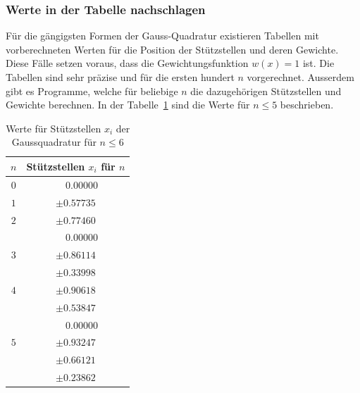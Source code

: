 \subsubsection{Werte in der Tabelle nachschlagen}
Für die gängigsten Formen der Gauss-Quadratur existieren Tabellen mit vorberechneten Werten für die
Position der Stützstellen und deren Gewichte.
Diese Fälle setzen voraus, dass die Gewichtungsfunktion $w(x) = 1$ ist. 
Die Tabellen sind sehr präzise und für die ersten hundert $n$ vorgerechnet.
Ausserdem gibt es Programme, welche für beliebige $n$ die dazugehörigen 
Stützstellen und Gewichte berechnen. 
In der Tabelle~\ref{buch:table:gaussabscissenwerte} sind die Werte für $n \leq 5$ beschrieben.
\begin{table}
    \centering
    \begin{tabular}{|c|c|}
        \hline
        $n$ & Stützstellen $x_{i}$ für $n$ \\
        \hline
        $0$ & $ \phantom{-} 0.00000 $ \\
        \hline
        $1$ & $ \pm 0.57735 $ \\
        \hline
        $2$ & $ \pm 0.77460 $ \\
            & $ \phantom{-} 0.00000 $ \\
        \hline
        $3$ & $ \pm 0.86114 $ \\
            & $ \pm 0.33998 $ \\
        \hline
        $4$ & $ \pm 0.90618 $ \\
            & $ \pm 0.53847 $ \\
            & $ \phantom{-} 0.00000 $ \\
        \hline
        $5$ & $ \pm 0.93247 $ \\
            & $ \pm 0.66121 $ \\
            & $ \pm 0.23862 $ \\
        \hline
    \end{tabular}
    \caption{Werte für Stützstellen $x_{i}$ der Gaussquadratur für $n \leq 6$
    \label{buch:table:gaussabscissenwerte}}    
\end{table}

